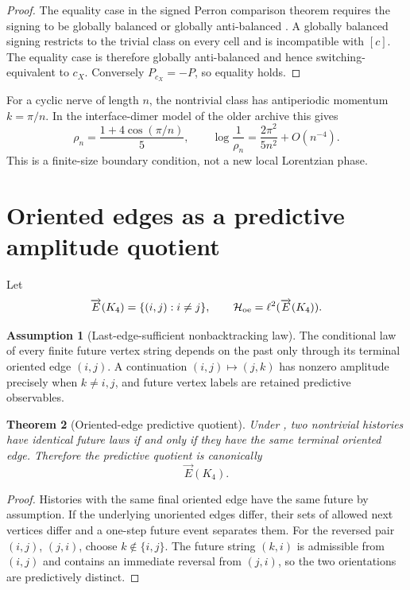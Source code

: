 \documentclass[11pt,oneside,openany]{book}
\numberwithin{equation}{chapter}
\newtheorem{theorem}{Theorem}[chapter]
\theoremstyle{definition}
\newtheorem{assumption}[theorem]{Assumption}
\theoremstyle{remark}
\begin{document}
\begin{proof}
The equality case in the signed Perron comparison theorem requires the
signing to be globally balanced or globally anti-balanced
\cite{Seneta1981,Zaslavsky1982}.  A globally balanced signing restricts to
the trivial class on every cell and is incompatible with \([c]\).  The
equality case is therefore globally anti-balanced and hence
switching-equivalent to \(c_X\).  Conversely \(P_{c_X}=-P\), so equality
holds.
\end{proof}

For a cyclic nerve of length \(n\), the nontrivial class has antiperiodic
momentum \(k=\pi/n\).  In the interface-dimer model of the older archive this
gives
\[
 \rho_n=\frac{1+4\cos(\pi/n)}5,
 \qquad
 \log\frac1{\rho_n}
 =\frac{2\pi^2}{5n^2}+O(n^{-4}).
\]
This is a finite-size boundary condition, not a new local Lorentzian phase.

\section{Oriented edges as a predictive amplitude quotient}

Let
\[
 \overrightarrow E(K_4)=\{(i,j):i\neq j\},
 \qquad
 \mathcal H_{\rm oe}=\ell^2(\overrightarrow E(K_4)).
\]

\begin{assumption}[Last-edge-sufficient nonbacktracking law]
\label{ass:last-edge-law}
The conditional law of every finite future vertex string depends on the past
only through its terminal oriented edge \((i,j)\).  A continuation
\((i,j)\mapsto(j,k)\) has nonzero amplitude precisely when \(k\neq i,j\),
and future vertex labels are retained predictive observables.
\end{assumption}

\begin{theorem}[Oriented-edge predictive quotient]
\label{thm:oriented-edge-quotient}
Under , two nontrivial histories have identical
future laws if and only if they have the same terminal oriented edge.
Therefore the predictive quotient is canonically
\[
 \boxed{\overrightarrow E(K_4).}
\]
\end{theorem}

\begin{proof}
Histories with the same final oriented edge have the same future by
assumption.  If the underlying unoriented edges differ, their sets of
allowed next vertices differ and a one-step future event separates them.
For the reversed pair \((i,j)\), \((j,i)\), choose
\(k\notin\{i,j\}\).  The future string \((k,i)\) is admissible from
\((i,j)\) and contains an immediate reversal from \((j,i)\), so the two
orientations are predictively distinct.
\end{proof}
\end{document}
